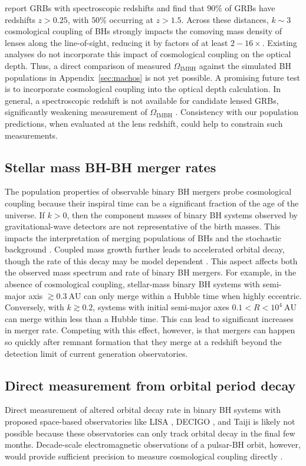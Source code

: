 \documentclass[twocolumn,twocolappendix]{aastex631}
\begin{document}
\citet{xiao2011redshift} report GRBs with spectroscopic redshifts and find that $90\%$ of GRBs have redshifts $z > 0.25$, with $50\%$ occurring at $z > 1.5$.
Across these distances, $k\sim 3$ cosmological coupling of BHs strongly impacts the comoving mass density of lenses along the line-of-sight, reducing it by factors of at least $2-16\times$.
Existing analyses do not incorporate this impact of cosmological coupling on the optical depth.
Thus, a direct comparison of measured $\Omega_\mathrm{IMBH}$ against the simulated BH populations in Appendix~\ref{sec:machos} is not yet possible.
A promising future test is to incorporate cosmological coupling into the optical depth calculation.
In general, a spectroscopic redshift is not available for candidate lensed GRBs, significantly weakening measurement of $\Omega_\mathrm{IMBH}$ \citep[e.g.][]{paynter21}.
Consistency with our population predictions, when evaluated at the lens redshift, could help to constrain such measurements.


\subsection{Stellar mass BH-BH merger rates}
The population properties of observable binary BH mergers probe cosmological coupling because their inspiral time can be a significant fraction of the age of the universe.
If $k > 0$, then the component masses of binary BH systems observed by gravitational-wave detectors are not representative of the birth masses.
This impacts the interpretation of merging populations of BHs \citep{2111.03634} and the stochastic background \citep{arzoumanian2020nanograv,christensen2019stochastic}.
Coupled mass growth further leads to accelerated orbital decay, though the rate of this decay may be model dependent \citep[c.f.][]{cro20,hadjidemetriou1963two}.
This aspect affects both the observed mass spectrum and rate of binary BH mergers.
For example, in the absence of cosmological coupling, stellar-mass binary BH systems with semi-major axis $\gtrsim 0.3~\mathrm{AU}$ can only merge within a Hubble time when highly eccentric. 
Conversely, with $k \gtrsim 0.2$, systems with initial semi-major axes $0.1 < R < 10^4~\mathrm{AU}$ can merge within less than a Hubble time.
This can lead to significant increases in merger rate.
Competing with this effect, however, is that mergers can happen so quickly after remnant formation that they merge at a redshift beyond the detection limit of current generation observatories.

\subsection{Direct measurement from orbital period decay}
Direct measurement of altered orbital decay rate in binary BH systems with proposed space-based observatories like LISA \citep{armano2018beyond}, DECIGO \citep{sato2017status}, and Taiji \citep{gong2021concepts} is likely not possible because these observatories can only track orbital decay in the final few months.
Decade-scale electromagnetic observations of a pulsar-BH orbit, however, would provide sufficient precision to measure cosmological coupling directly \citep[e.g.][]{cro19,weisberg2010binarypulsar}.
\end{document}
